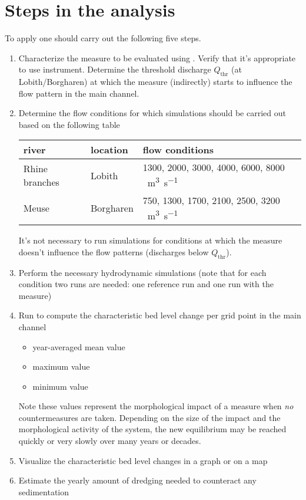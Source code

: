 \chapter{Steps in the analysis}\label{Chp:steps}

To apply \dfastmi one should carry out the following five steps.

\begin{enumerate}
\item Characterize the measure to be evaluated using \dfastmi.
Verify that it's appropriate to use \dfastmi instrument.
Determine the threshold discharge $Q_\text{thr}$ (at Lobith/Borgharen) at which the measure (indirectly) starts to influence the flow pattern in the main channel.

\item Determine the flow conditions for which \dflowfm simulations should be carried out based on the following table
\newline
\newline
\begin{tabular}{l|l|l}
river & location & flow conditions \\ \hline
Rhine branches & Lobith & 1300, 2000, 3000, 4000, 6000, 8000 \SI{}{\metre\cubed\per\second}\\
Meuse & Borgharen & 750, 1300, 1700, 2100, 2500, 3200 \SI{}{\metre\cubed\per\second}
\end{tabular}
\newline
\newline
It's not necessary to run simulations for conditions at which the measure doesn't influence the flow patterns (discharges below $Q_\text{thr}$).

\item Perform the necessary hydrodynamic simulations (note that for each condition two runs are needed: one reference run and one run with the measure)

\item Run \dfastmi to compute the characteristic bed level change per grid point in the main channel

\begin{itemize}
\item year-averaged mean value 
\item maximum value 
\item minimum value 
\end{itemize}

Note these values represent the morphological impact of a measure when \emph{no} countermeasures are taken.
Depending on the size of the impact and the morphological activity of the system, the new equilibrium may be reached quickly or very slowly over many years or decades.

\item{Visualize the characteristic bed level changes in a graph or on a map}

\item{Estimate the yearly amount of dredging needed to counteract any sedimentation}
\end{enumerate}
